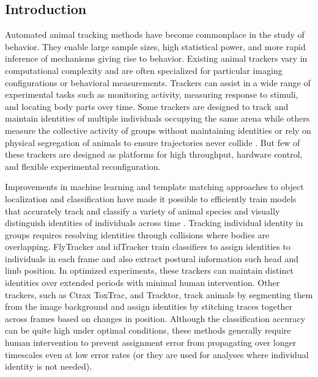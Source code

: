 \documentclass[10pt]{article}
\begin{document}
\vspace{1cm}
\begin{multicols}{2}
\noindent
\section*{Introduction}

Automated animal tracking methods have become commonplace in the study of behavior. They enable large sample sizes, high statistical power, and more rapid inference of mechanisms giving rise to behavior. Existing animal trackers vary in computational complexity and are often specialized for particular imaging configurations or behavioral measurements. Trackers can assist in a wide range of experimental tasks such as monitoring activity, measuring response to stimuli\cite{Fry_TrackFly_2008,Donelson_High_2012}, and locating body parts over time\cite{Mathis_DeepLabCut_2018,Pereira_Fast_2018}. Some trackers are designed to track and maintain identities of multiple individuals occupying the same arena \cite{Prez-Escudero_idTracker_2014,Eyjolfsdottir_Detecting_2014,Rodriguez_ToxId_2017,romero-ferrero_2019} while others measure the collective activity of groups without maintaining identities or rely on physical segregation of animals to ensure trajectories never collide \cite{Ramot_The_2008,Swierczek_High_2011,Itskovits_A_2017,Scaplen_Automated_2019}. But few of these trackers are designed as platforms for high throughput, hardware control, and flexible experimental reconfiguration. 

Improvements in machine learning and template matching approaches to object localization and classification have made it possible to efficiently train models that accurately track and classify a variety of animal species and visually distinguish identities of individuals across time \cite{Eyjolfsdottir_Detecting_2014,Prez-Escudero_idTracker_2014,schneider_2018}. Tracking individual identity in groups requires resolving identities through collisions where bodies are overlapping. FlyTracker and idTracker train classifiers to assign identities to individuals in each frame and also extract postural information such head and limb position. In optimized experiments, these trackers can maintain distinct identities over extended periods with minimal human intervention. Other trackers, such as Ctrax ToxTrac, and Tracktor\cite{Branson_High_2009,Rodriguez_ToxId_2017,Sridhar_2019}, track animals by segmenting them from the image background and assign identities by stitching traces together across frames based on changes in position. Although the classification accuracy can be quite high under optimal conditions, these methods generally require human intervention to prevent assignment error from propagating over longer timescales even at low error rates (or they are used for analyses where individual identity is not needed). 


\end{multicols}
\end{document}
